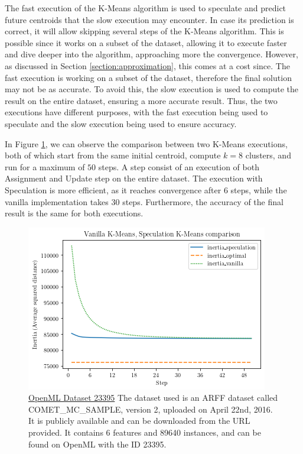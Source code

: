 The fast execution of the K-Means algorithm is used to speculate and predict future centroids that the slow execution may encounter. In case its prediction is correct, it will allow skipping several steps of the K-Means algorithm. This is possible since it works on a subset of the dataset, allowing it to execute faster and dive deeper into the algorithm, approaching more the convergence. However, as discussed in Section \ref{section:approximation}, this comes at a cost since. The fast execution is working on a subset of the dataset, therefore the final solution may not be as accurate. To avoid this, the slow execution is used to compute the result on the entire dataset, ensuring a more accurate result. Thus, the two executions have different purposes, with the fast execution being used to speculate and the slow execution being used to ensure accuracy.

In Figure \ref{fig:vanilla_speculation_comparison}, we can observe the comparison between two K-Means executions, both of which start from the same initial centroid, compute $k=8$ clusters, and run for a maximum of $50$ steps. A step consist of an execution of both Assignment and Update step on the entire dataset.
The execution with Speculation is more efficient, as it reaches convergence after 6 steps, while the vanilla implementation takes 30 steps. Furthermore, the accuracy of the final result is the same for both executions. 

\begin{figure}[h]
\centering
\includegraphics[width=\linewidth]{./plots/vanilla_speculation_comparison.png}
\caption{\href{https://www.openml.org/d/23395}{OpenML Dataset 23395} The dataset used is an ARFF dataset called COMET\_MC\_SAMPLE, version 2, uploaded on April 22nd, 2016. It is publicly available and can be downloaded from the URL provided. It contains 6 features and 89640 instances, and can be found on OpenML with the ID 23395.}
\label{fig:vanilla_speculation_comparison}
\end{figure}
